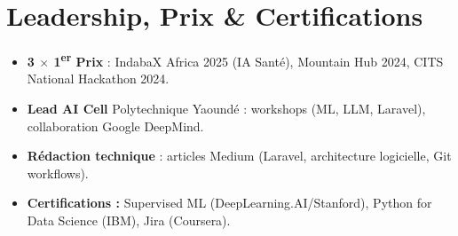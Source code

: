 \documentclass[a4paper,11pt]{article}
\begin{document}
\section{Leadership, Prix \& Certifications}
\begin{itemize}[leftmargin=*, label=\tiny$\bullet$, nosep]
    \item \small{\textbf{3 $\times$ 1\textsuperscript{er} Prix} : IndabaX Africa 2025 (IA Santé), Mountain Hub 2024, CITS National Hackathon 2024.}
    \item \small{\textbf{Lead AI Cell} Polytechnique Yaoundé : workshops (ML, LLM, Laravel), collaboration Google DeepMind.}
    \item \small{\textbf{Rédaction technique} : articles Medium (Laravel, architecture logicielle, Git workflows).}
    \item \small{\textbf{Certifications :} Supervised ML (DeepLearning.AI/Stanford), Python for Data Science (IBM), Jira (Coursera).}
\end{itemize}
\end{document}
